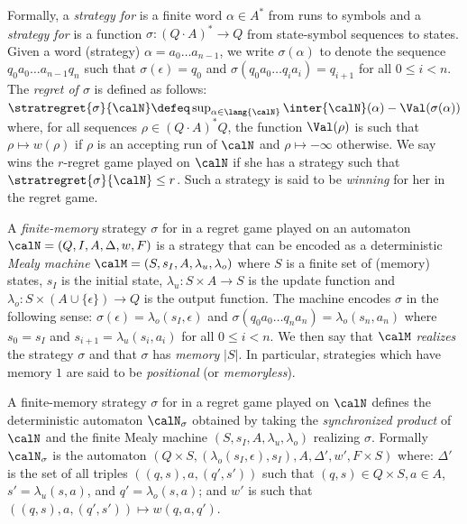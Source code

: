 \documentclass[a4paper]{article}
\begin{document}
Formally, a \emph{strategy for \adam} is a finite word $\alpha \in A^*$ from runs to
symbols and a \emph{strategy for \eve} is a function $\sigma : (Q \cdot A)^* \to
Q$ from state-symbol sequences to states. Given a word (strategy) $\alpha = a_0
\dots a_{n-1}$, we write $\sigma(\alpha)$ to denote the sequence $q_0 a_0 \dots
a_{n-1} q_n$ such that $\sigma(\epsilon) = q_0$ and $\sigma(q_0 a_0 \dots q_i
a_i) = q_{i+1}$ for all $0 \le i < n$. The \emph{regret of $\sigma$} is defined
as follows:
\( 
	\stratregret{\sigma}{\calN} \defeq \sup_{\alpha \in \lang{\calN}}
	\inter{\calN}(\alpha) - \Val(\sigma(\alpha))
\)
where, for all sequences $\rho \in (Q \cdot A)^*Q$, the function $\Val(\rho)$ is
such that $\rho \mapsto  w(\rho)$ if $\rho$ is an accepting run of $\calN$ and
$\rho \mapsto -\infty$ otherwise.  We say \eve wins the $r$-regret game played
on $\calN$ if she has a strategy such that $\stratregret{\sigma}{\calN} \le r$.
Such a strategy is said to be \emph{winning} for her in the regret game.

A \emph{finite-memory} 
strategy $\sigma$ for \eve in a regret game played on an automaton
$\calN = (Q,I,A,\Delta,w,F)$ is a strategy that can be encoded as a deterministic 
\emph{Mealy machine} $\calM = (S,s_I,A,\lambda_u,\lambda_o)$ where
$S$ is a finite set of (memory) states, $s_I$ is the initial state,
$\lambda_u : S \times A \to S$ is the update function and $\lambda_o : S \times (A
\cup \{\epsilon\}) \to Q$ is the output function. The machine encodes $\sigma$
in the following sense: $\sigma(\epsilon) = \lambda_o(s_I,\epsilon)$ and
$\sigma(q_0 a_0 \dots q_n a_n) = \lambda_o(s_{n}, a_{n})$
where $s_0 = s_I$ and $s_{i+1} = \lambda_u(s_i, a_i)$ for all $0 \le i < n$.  We
then say that $\calM$ \emph{realizes} the strategy $\sigma$ and that $\sigma$
has \emph{memory} $|S|$.  In particular, strategies which have memory $1$ are
said to be \emph{positional} (or \emph{memoryless}).

A finite-memory strategy $\sigma$ for \eve in a regret game played on $\calN$
defines the deterministic automaton $\calN_\sigma$ obtained by taking the
\emph{synchronized product} of $\calN$ and the finite Mealy machine
$(S,s_I,A,\lambda_u,\lambda_o)$ realizing $\sigma$. Formally $\calN_\sigma$
is the automaton $(Q\times S,(\lambda_o(s_I,\epsilon),s_I), A,\Delta',w',F \times S)$
where: $\Delta'$ is the set of all triples $\left( (q,s),a,(q',s') \right)$ such
that $(q,s) \in Q \times S,a \in A$, $s' = \lambda_u(s,a)$, and $q' =
\lambda_o(s,a)$; and $w'$ is such that $\left((q,s),a,(q',s')\right) \mapsto
w(q,a,q')$.
\end{document}
